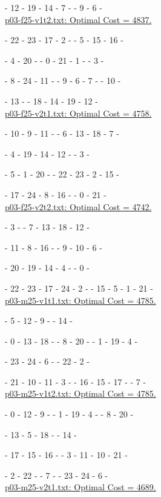 \tc - 12 - 19 - 14 - 7 - \tc - 9 - 6 - \tc
\\ 

\underline{p03-f25-v1t2.txt: Optimal Cost =  4837. }
 
\ta - 22 - 23 - 17 - 2 - \ta - 5 - 15 - 16 - \ta
 
\ta - 4 - 20 - \ta - 0 - 21 - 1 - \ta - 3 - \ta

\tc - 8 - 24 - 11 - \tc - 9 - 6 - 7 - \tc - 10 - \tc 

\tc - 13 - \tc - 18 - 14 - 19 - 12 - \tc
\\ 

\underline{p03-f25-v2t1.txt: Optimal Cost =  4758.}
 
\ta - 10 - 9 - 11 - \ta - 6 - 13 - 18 - 7 - \ta

\ta - 4 - 19 - 14 - 12 - \ta - 3 - \ta

\te - 5 - 1 - 20 - \te - 22 - 23 - 2 - 15 - \te 

\te - 17 - 24 - 8 - 16 - \te - 0 - 21 - \te
\\ 

\underline{p03-f25-v2t2.txt: Optimal Cost = 4742. }
 
\ta - 3 - \ta - 7 - 13 - 18 - 12 - \ta

\ta - 11 - 8 - 16 - \ta - 9 - 10 - 6 -\ta

\te - 20 - 19 - 14 - 4 - \te - 0 -  \te 

\te - 22 - 23 - 17 - 24 - 2 - \te - 15 - 5 - 1 - 21 - \te
\\ 

\underline{p03-m25-v1t1.txt: Optimal Cost = 4785. }
 
\ta - 5 - 12 - 9 - \ta - 14 - \ta

\ta - 0 - 13 - 18 - \ta - 8 - 20 - \ta - 1 - 19 - 4 - \ta

\te - 23 - 24 - 6 - \te - 22 - 2 - \te 

\te - 21 - 10 - 11 - 3 - \te - 16 - 15 - 17 - \te - 7 -\te
\\ 

\underline{p03-m25-v1t2.txt: Optimal Cost = 4785. }
 
\ta - 0 - 12 - 9 - \ta - 1 - 19 - 4 - \ta - 8 - 20 - \ta

\ta - 13 - 5 - 18 - \ta - 14 - \ta

\te - 17 - 15 - 16 - \te - 3 - 11 - 10 - 21 - \te 

\te - 2 - 22 - \te - 7 - \te - 23 - 24 - 6 - \te
\\ 

\underline{p03-m25-v2t1.txt: Optimal Cost = 4689. }
 
